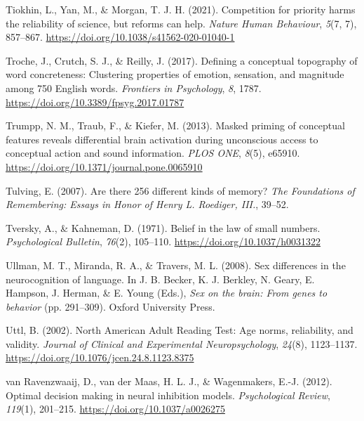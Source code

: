 \documentclass[
  12pt,
  man,floatsintext]{apa7}
\newlength{\cslhangindent}
\newlength{\cslentryspacingunit} %
\newenvironment{CSLReferences}[2] %
 {%
  \setlength{\parindent}{0pt}
  \ifodd #1
  \let\oldpar\par
  \def\par{\hangindent=\cslhangindent\oldpar}
  \fi
  \setlength{\parskip}{#2\cslentryspacingunit}
 }%
 {}
\begin{document}
\begin{CSLReferences}{1}{0}
\leavevmode{}%
Tiokhin, L., Yan, M., \& Morgan, T. J. H. (2021). Competition for priority harms the reliability of science, but reforms can help. \emph{Nature Human Behaviour}, \emph{5}(7, 7), 857--867. \url{https://doi.org/10.1038/s41562-020-01040-1}

\leavevmode{}%
Troche, J., Crutch, S. J., \& Reilly, J. (2017). Defining a conceptual topography of word concreteness: {Clustering} properties of emotion, sensation, and magnitude among 750 {English} words. \emph{Frontiers in Psychology}, \emph{8}, 1787. \url{https://doi.org/10.3389/fpsyg.2017.01787}

\leavevmode{}%
Trumpp, N. M., Traub, F., \& Kiefer, M. (2013). Masked priming of conceptual features reveals differential brain activation during unconscious access to conceptual action and sound information. \emph{PLOS ONE}, \emph{8}(5), e65910. \url{https://doi.org/10.1371/journal.pone.0065910}

\leavevmode{}%
Tulving, E. (2007). Are there 256 different kinds of memory? \emph{The Foundations of Remembering: Essays in Honor of Henry L. Roediger, III.}, 39--52.

\leavevmode{}%
Tversky, A., \& Kahneman, D. (1971). Belief in the law of small numbers. \emph{Psychological Bulletin}, \emph{76}(2), 105--110. \url{https://doi.org/10.1037/h0031322}

\leavevmode{}%
Ullman, M. T., Miranda, R. A., \& Travers, M. L. (2008). Sex differences in the neurocognition of language. In J. B. Becker, K. J. Berkley, N. Geary, E. Hampson, J. Herman, \& E. Young (Eds.), \emph{Sex on the brain: {From} genes to behavior} (pp. 291--309). {Oxford University Press}.

\leavevmode{}%
Uttl, B. (2002). North {American Adult Reading Test}: {Age} norms, reliability, and validity. \emph{Journal of Clinical and Experimental Neuropsychology}, \emph{24}(8), 1123--1137. \url{https://doi.org/10.1076/jcen.24.8.1123.8375}

\leavevmode{}%
van Ravenzwaaij, D., van der Maas, H. L. J., \& Wagenmakers, E.-J. (2012). Optimal decision making in neural inhibition models. \emph{Psychological Review}, \emph{119}(1), 201--215. \url{https://doi.org/10.1037/a0026275}


\end{CSLReferences}
\end{document}
